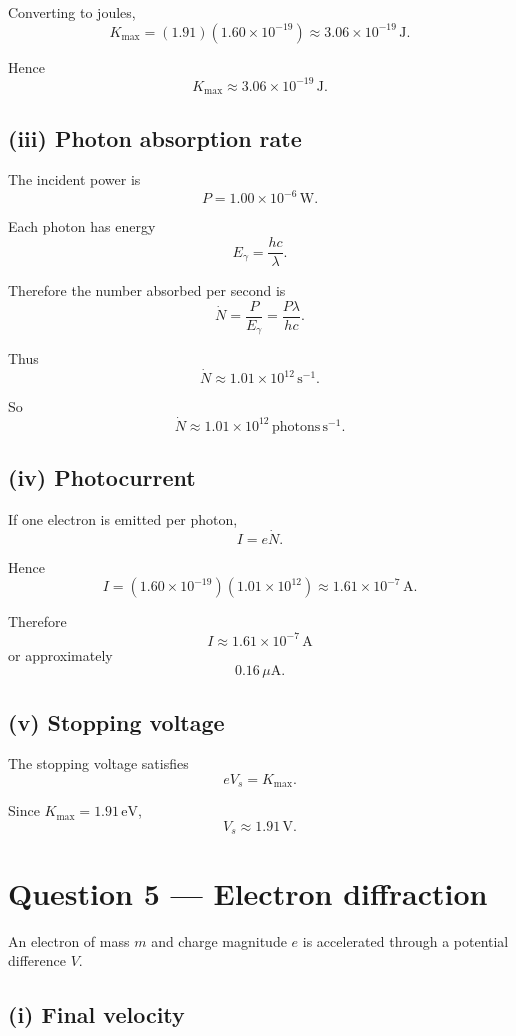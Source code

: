 \documentclass[11pt,a4paper]{article}
\begin{document}
Converting to joules,
\[
K_{\max}
=
(1.91)(1.60\times10^{-19})
\approx3.06\times10^{-19}\,\mathrm J.
\]

Hence
\[
\boxed{K_{\max}\approx3.06\times10^{-19}\,\mathrm J}.
\]

\subsection{(iii) Photon absorption rate}

The incident power is
\[
P=1.00\times10^{-6}\,\mathrm W.
\]

Each photon has energy
\[
E_\gamma=\frac{hc}{\lambda}.
\]

Therefore the number absorbed per second is
\[
\dot N
=
\frac{P}{E_\gamma}
=
\frac{P\lambda}{hc}.
\]

Thus
\[
\dot N
\approx
1.01\times10^{12}\,\mathrm{s^{-1}}.
\]

So
\[
\boxed{\dot N\approx1.01\times10^{12}\,\mathrm{photons\,s^{-1}}}.
\]

\subsection{(iv) Photocurrent}

If one electron is emitted per photon,
\[
I=e\dot N.
\]

Hence
\[
I
=
(1.60\times10^{-19})
(1.01\times10^{12})
\approx1.61\times10^{-7}\,\mathrm A.
\]

Therefore
\[
\boxed{I\approx1.61\times10^{-7}\,\mathrm A}
\]
or approximately
\[
\boxed{0.16\,\mu\mathrm A}.
\]

\subsection{(v) Stopping voltage}

The stopping voltage satisfies
\[
eV_s=K_{\max}.
\]

Since $K_{\max}=1.91\,\mathrm{eV}$,
\[
\boxed{V_s\approx1.91\,\mathrm V}.
\]

\section{Question 5 --- Electron diffraction}

An electron of mass $m$ and charge magnitude $e$ is accelerated through a potential
difference $V$.

\subsection{(i) Final velocity}
\end{document}
